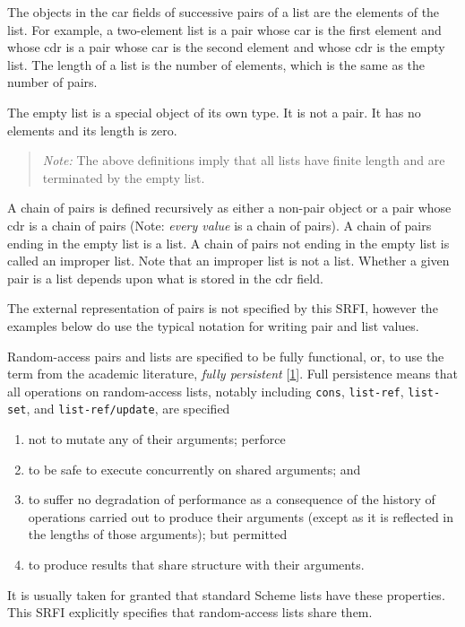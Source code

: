 The objects in the car fields of successive pairs of a list are the
elements of the list. For example, a two-element list is a pair whose
car is the first element and whose cdr is a pair whose car is the second
element and whose cdr is the empty list. The length of a list is the
number of elements, which is the same as the number of pairs.

The empty list is a special object of its own type. It is not a pair. It
has no elements and its length is zero.

\begin{quote}
\emph{Note:} The above definitions imply that all lists have finite
length and are terminated by the empty list.
\end{quote}

A chain of pairs is defined recursively as either a non-pair object or a
pair whose cdr is a chain of pairs (Note: \emph{every value} is a chain
of pairs). A chain of pairs ending in the empty list is a list. A chain
of pairs not ending in the empty list is called an improper list. Note
that an improper list is not a list. Whether a given pair is a list
depends upon what is stored in the cdr field.

The external representation of pairs is not specified by this SRFI,
however the examples below do use the typical notation for writing pair
and list values.

Random-access pairs and lists are specified to be fully functional, or,
to use the term from the academic literature, \emph{fully persistent}
{[}\protect\hyperlink{note-1}{1}{]}. Full persistence means that all
operations on random-access lists, notably including \texttt{cons},
\texttt{list-ref}, \texttt{list-set}, and \texttt{list-ref/update}, are
specified

\begin{enumerate}
\tightlist
\item
  not to mutate any of their arguments; perforce
\item
  to be safe to execute concurrently on shared arguments; and
\item
  to suffer no degradation of performance as a consequence of the
  history of operations carried out to produce their arguments (except
  as it is reflected in the lengths of those arguments); but permitted
\item
  to produce results that share structure with their arguments.
\end{enumerate}

It is usually taken for granted that standard Scheme lists have these
properties. This SRFI explicitly specifies that random-access lists
share them.

